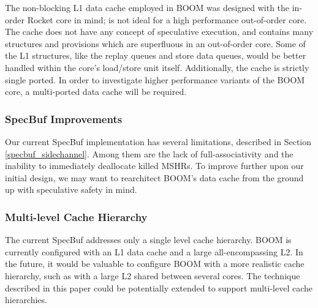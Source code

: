 The non-blocking L1 data cache employed in BOOM was designed with the in-order Rocket core in mind;
is not ideal for a high performance out-of-order core. The cache does not have any concept of
speculative execution, and contains many structures and provisions which are superfluous in an
out-of-order core. Some of the L1 structures, like the replay queues and store data queues, would be
better handled within the core's load/store unit itself.
Additionally, the cache is strictly single ported. In order to investigate higher performance variants
of the BOOM core, a multi-ported data cache will be required.

\subsubsection{SpecBuf Improvements}

Our current SpecBuf implementation has several limitations, described in Section \ref{specbuf_sidechannel}.
Among them are the lack of full-associativity and the inability to immediately deallocate killed MSHRs.
To improve further upon our initial design, we may want to rearchitect BOOM's data cache from
the ground up with speculative safety in mind.

\subsubsection{Multi-level Cache Hierarchy}

The current SpecBuf addresses only a single level cache hierarchy.
BOOM is currently configured with an L1 data cache and a large all-encompassing L2.
In the future, it would be valuable to configure BOOM with a more realistic cache hierarchy,
such as with a large L2 shared between several cores. The technique described in this paper
could be potentially extended to support multi-level cache hierarchies.
